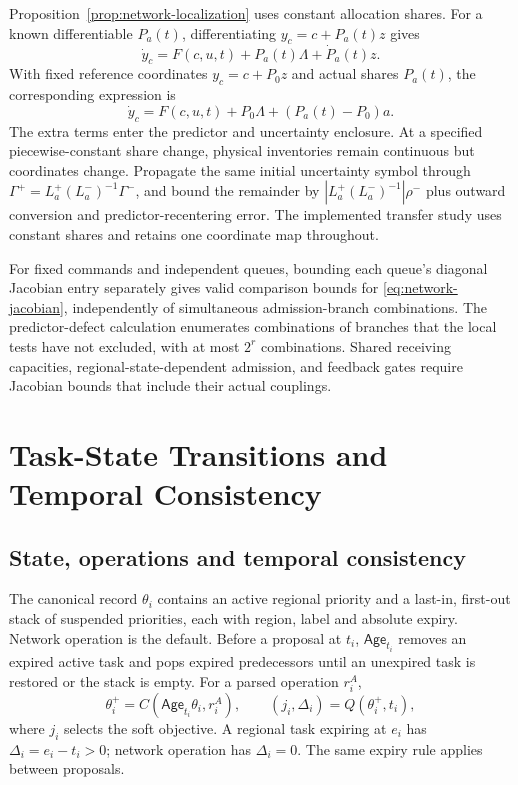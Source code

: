 Proposition~\ref{prop:network-localization} uses constant allocation shares.
For a known differentiable $P_a(t)$, differentiating $y_c=c+P_a(t)z$ gives
\begin{equation}
 \dot y_c=F(c,u,t)+P_a(t)\Lambda+\dot P_a(t)z.
 \label{eq:network-varying-allocation}
\end{equation}
With fixed reference coordinates $y_c=c+P_0z$ and actual shares $P_a(t)$,
the corresponding expression is
\begin{equation}
 \dot y_c=F(c,u,t)+P_0\Lambda+(P_a(t)-P_0)a.
 \label{eq:network-uncertain-allocation}
\end{equation}
The extra terms enter the predictor and uncertainty enclosure. At a specified
piecewise-constant share change, physical inventories remain continuous but
coordinates change. Propagate the same initial uncertainty symbol through
$\Gamma^+=L_a^+(L_a^-)^{-1}\Gamma^-$, and bound the remainder by
$|L_a^+(L_a^-)^{-1}|\rho^-$ plus outward conversion and predictor-recentering
error. The implemented
transfer study uses constant shares and retains one coordinate map throughout.

For fixed commands and independent queues, bounding each queue's diagonal
Jacobian entry separately gives valid comparison bounds for
\eqref{eq:network-jacobian}, independently of simultaneous admission-branch
combinations. The predictor-defect calculation enumerates combinations of
branches that the local tests have not excluded, with at most $2^r$
combinations. Shared receiving capacities, regional-state-dependent
admission, and feedback gates require Jacobian bounds that include their
actual couplings.

\section{Task-State Transitions and Temporal Consistency}
\label{app:task-state-compiler}

\subsection{State, operations and temporal consistency}

The canonical record $\theta_i$ contains an active regional priority and a
last-in, first-out stack of suspended priorities, each with region, label and
absolute expiry. Network operation is the default. Before a proposal at $t_i$,
$\mathsf{Age}_{t_i}$ removes an expired active task and pops expired predecessors until
an unexpired task is restored or the stack is empty. For a parsed operation
$r_i^A$,
\begin{equation}
 \theta_i^+=C(\mathsf{Age}_{t_i}\theta_i,r_i^A),\qquad
 (j_i,\Delta_i)=Q(\theta_i^+,t_i),
 \label{eq:task-state-compiler}
\end{equation}
where $j_i$ selects the soft objective. A regional task expiring at $e_i$
has $\Delta_i=e_i-t_i>0$; network operation has $\Delta_i=0$.
The same expiry rule applies between proposals.

